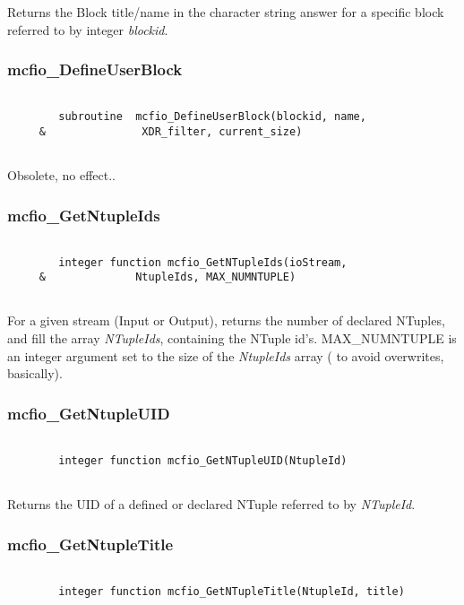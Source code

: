 Returns the Block title/name in the character string answer
for a specific block referred to by integer {\em blockid}.
	  

\subsubsection{mcfio\_DefineUserBlock}

\begin{verbatim}

        subroutine  mcfio_DefineUserBlock(blockid, name,
     &               XDR_filter, current_size)
    
\end{verbatim}

Obsolete, no effect.. 

\subsubsection{mcfio\_GetNtupleIds}

\begin{verbatim}

        integer function mcfio_GetNTupleIds(ioStream,
     &              NtupleIds, MAX_NUMNTUPLE)
     
\end{verbatim}

For a given stream (Input or Output), returns the number of declared
NTuples, and fill the array {\em NTupleIds}, containing the NTuple id's. 
MAX\_NUMNTUPLE is an integer argument set to the size of the {\em NtupleIds}
array ( to avoid overwrites, basically). 
 
	
\subsubsection{mcfio\_GetNtupleUID}

\begin{verbatim}

        integer function mcfio_GetNTupleUID(NtupleId)
        
\end{verbatim}

Returns the UID of a defined or declared NTuple referred to by {\em
NTupleId}. 
	
	
\subsubsection{mcfio\_GetNtupleTitle}

\begin{verbatim}

        integer function mcfio_GetNTupleTitle(NtupleId, title)
        
\end{verbatim}

